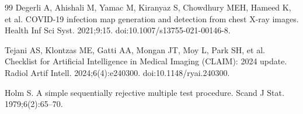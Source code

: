 \begin{thebibliography}{99}
Degerli A, Ahishali M, Yamac M, Kiranyaz S, Chowdhury MEH, Hameed K, et al. COVID-19 infection map generation and detection from chest X-ray images. Health Inf Sci Syst. 2021;9:15. doi:10.1007/s13755-021-00146-8.

Tejani AS, Klontzas ME, Gatti AA, Mongan JT, Moy L, Park SH, et al. Checklist for Artificial Intelligence in Medical Imaging (CLAIM): 2024 update. Radiol Artif Intell. 2024;6(4):e240300. doi:10.1148/ryai.240300.

Holm S. A simple sequentially rejective multiple test procedure. Scand J Stat. 1979;6(2):65--70.

\end{thebibliography}
